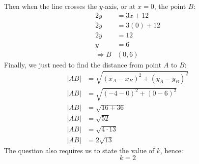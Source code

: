 \documentclass[hidelinks, a4paper, 12pt]{article}
\newcommand{\thus}{\Rightarrow}
\begin{document}
                Then when the line crosses the $y$-axis, or at $x = 0$, the point $B$:
                \[\begin{split}
                    2y &= 3x + 12\\
                    2y &= 3(0) + 12\\
                    2y &= 12\\
                    y &= 6\\
                    \thus B &(0, 6)
                \end{split}\]
                Finally, we just need to find the distance from point $A$ to $B$:
                \[\begin{split}
                    |AB| &= \sqrt{(x_A-x_B)^2 + (y_A-y_B)^2}\\
                    |AB| &= \sqrt{(-4-0)^2 + (0-6)^2}\\
                    |AB| &= \sqrt{16+36}\\
                    |AB| &= \sqrt{52}\\
                    |AB| &= \sqrt{4\cdot 13}\\
                    |AB| &= 2\sqrt{13}
                \end{split}\]
                The question also requires us to state the value of $k$, hence:
                \[k = 2\]
\end{document}
